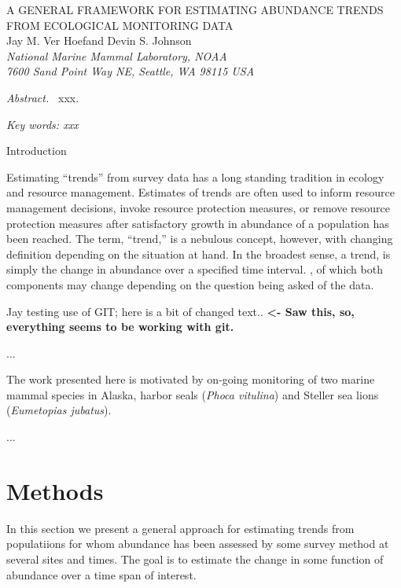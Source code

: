 \documentclass[12pt,letter]{article}
\begin{document}
\begin{center}
\Large A GENERAL FRAMEWORK FOR ESTIMATING ABUNDANCE TRENDS FROM ECOLOGICAL MONITORING DATA
\bigskip\\
\normalsize
{\sc Jay M. Ver Hoef\footnotemark[1] and Devin S. Johnson}\smallskip\\
{\em National Marine Mammal Laboratory, NOAA\\
7600 Sand Point Way NE, Seattle,
WA 98115 USA }\\ \medskip
\end{center}

\raggedright \setlength{\parindent}{0.3in}
\renewcommand{\baselinestretch}{1.7}\normalsize
{}
 \linenumbers

{\em Abstract.\ } xxx.

{\em Key words: xxx}

\centerline{\sc Introduction}

Estimating ``trends'' from survey data has a long standing tradition in ecology and resource management. Estimates of trends are often used to inform resource management decisions, invoke resource protection measures, or remove resource protection measures after satisfactory growth in abundance of a population has been reached. The term, ``trend,'' is a nebulous concept, however, with changing definition depending on the situation at hand. In the broadest sense, a trend, is simply the change in abundance over a specified time interval. , of which both components may change depending on the question being asked of the data.   

Jay testing use of GIT; here is a bit of changed text.. {\bf <- Saw this, so, everything seems to be working with git.}

...

The work presented here is motivated by on-going monitoring of two marine mammal species in Alaska, harbor seals ({\it Phoca vitulina}) and Steller sea lions ({\it Eumetopias jubatus}).

...
   
\section{Methods}

In this section we present a general approach for estimating trends from populatiions for whom abundance has been assessed by some survey method at several sites and times. The goal is to estimate the change in some function of abundance over a time span of interest. 
\end{document}
